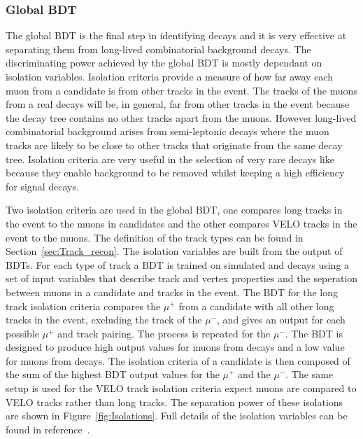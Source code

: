 \subsubsection{Global BDT}
\label{sec:globalBDT}

The global BDT is the final step in identifying \bmumu decays and it is very effective at separating them from long-lived combinatorial background decays. The discriminating power achieved by the global BDT is mostly dependant on isolation variables. Isolation criteria provide a measure of how far away each muon from a \bmumu candidate is from other tracks in the event. The tracks of the muons from a real \bmumu decays will be, in general, far from other tracks in the event because the \bmumu decay tree contains no other tracks apart from the muons. However long-lived combinatorial background arises from semi-leptonic decays where the muon tracks are likely to be close to other tracks that originate from the same decay tree. %
Isolation criteria are very useful in the selection of very rare decays like \bsmumu because they enable background to be removed whilst keeping a high efficiency for signal decays.

Two isolation criteria are used in the global BDT, one compares long tracks in the event to the muons in \bmumu candidates and the other compares VELO tracks in the event to the muons. The definition of the track types can be found in Section~\ref{sec:Track_recon}. The isolation variables are built from the output of BDTs. For each type of track a BDT is trained on simulated \bsmumu and \bbbarmumux decays using a set of input variables that describe track and vertex properties and the seperation between muons in a \bmumu candidate and tracks in the event. 
The BDT for the long track isolation criteria compares the $\mu^{+}$ from a \bsmumu candidate with all other long tracks in the event, excluding the track of the $\mu^{-}$, and gives an output for each possible $\mu^{+}$ and track pairing. The process is repeated for the $\mu^{-}$. The BDT is designed to produce high output values for muons from \bbbarmumux decays and a low value for muons from \bsmumu decays. The isolation criteria of a \bsmumu candidate is then composed of the sum of the highest BDT output values for the $\mu^{+}$ and the $\mu^{-}$. The same setup is used for the VELO track isolation criteria expect muons are compared to VELO tracks rather than long tracks. The separation power of these isolations are shown in Figure~\ref{fig:Isolations}. Full details of the isolation variables can be found in reference~\cite{Archilli:1970886}.


